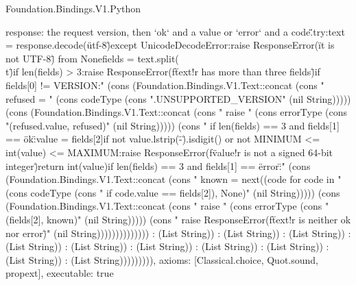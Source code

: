 \begin{lexlean}{Foundation.Bindings.V1.Python}
\begin{semanticmodule}
{response: the request version, then `ok` and a value or `error` and a code.\"\"\"\n    try:\n        text = response.decode(\"utf-8\")\n    except UnicodeDecodeError:\n        raise ResponseError(\"it is not UTF-8\") from None\n    fields = text.split(\"\\t\")\n    if len(fields) > 3:\n        raise ResponseError(f\"{text!r} has more than three fields\")\n    if fields[0] != VERSION:" (cons (Foundation.Bindings.V1.Text::concat (cons "        refused = " (cons codeType (cons ".UNSUPPORTED_VERSION" (nil String))))) (cons (Foundation.Bindings.V1.Text::concat (cons "        raise " (cons errorType (cons "(refused.value, refused)" (nil String))))) (cons "    if len(fields) == 3 and fields[1] == \"ok\":\n        value = fields[2]\n        if not value.lstrip(\"-\").isdigit() or not MINIMUM <= int(value) <= MAXIMUM:\n            raise ResponseError(f\"{value!r} is not a signed 64-bit integer\")\n        return int(value)\n    if len(fields) == 3 and fields[1] == \"error\":" (cons (Foundation.Bindings.V1.Text::concat (cons "        known = next((code for code in " (cons codeType (cons " if code.value == fields[2]), None)" (nil String))))) (cons (Foundation.Bindings.V1.Text::concat (cons "        raise " (cons errorType (cons "(fields[2], known)" (nil String))))) (cons "    raise ResponseError(f\"{text!r} is neither ok nor error\")" (nil String)))))))))))))) : (List String)) : (List String)) : (List String)) : (List String)) : (List String)) : (List String)) : (List String)) : (List String)) : (List String)) : (List String))))))))),
  axioms: [Classical.choice, Quot.sound, propext],
  executable: true
}


\end{semanticmodule}
\end{lexlean}
